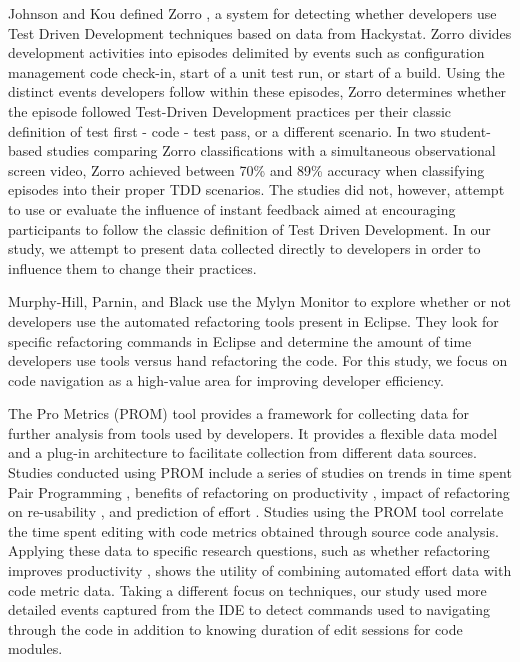 \documentclass{sig-alternate}
\begin{document}
Johnson and Kou defined Zorro \cite{V:Johnson2007Automated}, a system for detecting whether developers use Test Driven Development techniques based on data from Hackystat.  Zorro divides development activities into episodes delimited by events such as configuration management code check-in, start of a unit test run, or start of a build.  Using the distinct events developers follow within these episodes, Zorro determines whether the episode followed Test-Driven Development practices per their classic definition of test first - code - test pass, or a different scenario. In two student-based studies comparing Zorro classifications with a simultaneous observational screen video, Zorro achieved between 70\% \cite{Kou2010Operational} and 89\% \cite{V:Johnson2007Automated} accuracy when classifying episodes into their proper TDD scenarios.  The studies did not, however, attempt to use or evaluate the influence of instant feedback aimed at encouraging participants to follow the classic definition of Test Driven Development.  In our study, we attempt to present data collected directly to developers in order to influence them to change their practices.

Murphy-Hill, Parnin, and Black \cite{V:MurphyHill2012How} use the Mylyn Monitor to explore whether or not developers use the automated refactoring tools present in Eclipse.  They look for specific refactoring commands in Eclipse and determine the amount of time developers use tools versus hand refactoring the code.  For this study, we focus on code navigation as a high-value area for improving developer efficiency.

The Pro Metrics (PROM) tool provides a framework for collecting data for further analysis from tools used by developers.\cite{Coman2009Casestudy}  It provides a flexible data model and a plug-in architecture to facilitate collection from different data sources.  Studies conducted using PROM include a series of studies on trends in time spent Pair Programming \cite{Coman2008Investigating}, benefits of refactoring on productivity \cite{Moser2008Case}, impact of refactoring on re-usability \cite{Moser2006Does}, and prediction of effort \cite{Abrahamsson2007Effort}.  Studies using the PROM tool correlate the time spent editing with code metrics obtained through source code analysis.  Applying these data to specific research questions, such as whether refactoring improves productivity \cite{Moser2008Case}, shows the utility of combining automated effort data with code metric data.  Taking a different focus on techniques, our study used more detailed events captured from the IDE to detect commands used to navigating through the code in addition to knowing duration of edit sessions for code modules.
\end{document}
